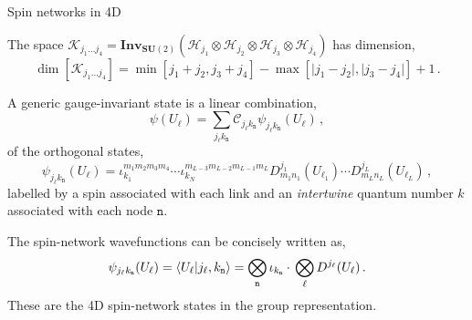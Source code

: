 \documentclass{beamer}
\newcommand\italictext[1]{\textcolor{italics}{\textit{#1}}}
\begin{document}
\begin{frame}{Spin networks in 4D}
    \begin{list}{\maltese}{\leftmargin=1em \itemindent=0em}
        \item<1-> The space $\mathcal{K}_{j_1\dots j_4}=\mathbf{Inv}_{\mathbf{SU}(2)}(\mathcal{H}_{j_1}\otimes\mathcal{H}_{j_2}\otimes\mathcal{H}_{j_3}\otimes\mathcal{H}_{j_4})$ has dimension,
        \begin{equation}
            \operatorname{dim}[\mathcal{K}_{j_1\dots j_4}]=\operatorname{min}[j_1+j_2,j_3+j_4]-\operatorname{max}[\lvert j_1-j_2\rvert,\lvert j_3-j_4\rvert]+1\,.
        \end{equation}
        \item<2-> A generic gauge-invariant state is a linear combination,
        \begin{equation}
            \psi(U_\ell)=\sum_{j_\ell k_\mathtt{n}} \mathcal{C}_{j_\ell k_\mathtt{n}}\psi_{j_\ell k_\mathtt{n}}(U_\ell)\,,
        \end{equation}
        of the orthogonal states,
        \begin{equation*}
            \psi_{j_\ell k_\mathtt{n}} (U_\ell)=\iota^{m_1m_2m_3m_4}_{k_1}\cdots\iota^{m_{L-3}m_{L-2}m_{L-1}m_L}_{k_N} D^{j_1}_{m_1n_1}(U_{\ell_1})\cdots D^{j_L}_{m_Ln_L}(U_{\ell_L})\,,
        \end{equation*}
        labelled by a spin associated with each link and an \italictext{intertwine} quantum number $k$ associated with each node $\mathtt{n}$.
        \item<3-> The spin-network wavefunctions can be concisely written as,
        \begin{equation}
            \psi_{j_\ell k_\mathtt{n}}(U_\ell)= \braket{U_\ell}{j_\ell,k_\mathtt{n}}=\bigotimes_\mathtt{n}\iota_{k_\mathtt{n}}\cdot\,\bigotimes_\ell D^{j_\ell}(U_\ell)\,.
        \end{equation}
        These are the 4D spin-network states in the group representation. 
    \end{list}
\end{frame}
\end{document}

